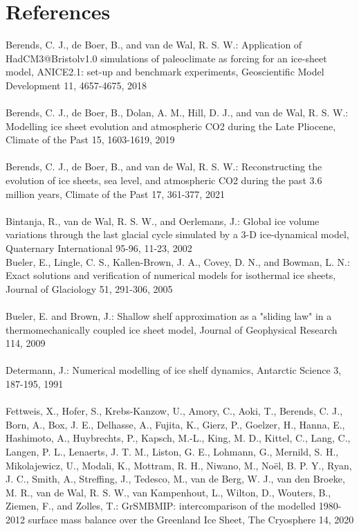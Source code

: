 \documentclass{article}
\begin{document}
\newpage
\section{References}

Berends, C. J., de Boer, B., and van de Wal, R. S. W.: Application of HadCM3@Bristolv1.0 simulations of paleoclimate as forcing for an ice-sheet model, ANICE2.1: set-up and benchmark experiments, Geoscientific Model Development 11, 4657-4675, 2018\\
\\
Berends, C. J., de Boer, B., Dolan, A. M., Hill, D. J., and van de Wal, R. S. W.: Modelling ice sheet evolution and atmospheric CO2 during the Late Pliocene, Climate of the Past 15, 1603-1619, 2019\\
\\
Berends, C. J., de Boer, B., and van de Wal, R. S. W.: Reconstructing the evolution of ice sheets, sea level, and atmospheric CO2 during the past 3.6 million years, Climate of the Past 17, 361-377, 2021\\
\\
Bintanja, R., van de Wal, R. S. W., and Oerlemans, J.: Global ice volume variations through the last glacial cycle simulated by a 3-D ice-dynamical model, Quaternary International 95-96, 11-23, 2002\
\\
Bueler, E., Lingle, C. S., Kallen-Brown, J. A., Covey, D. N., and Bowman, L. N.: Exact solutions and verification of numerical models for isothermal ice sheets, Journal of Glaciology 51, 291-306, 2005\\
\\
Bueler, E. and Brown, J.: Shallow shelf approximation as a "sliding law" in a thermomechanically coupled ice sheet model, Journal of Geophysical Research 114, 2009\\
\\
Determann, J.: Numerical modelling of ice shelf dynamics, Antarctic Science 3, 187-195, 1991\\
\\
Fettweis, X., Hofer, S., Krebs-Kanzow, U., Amory, C., Aoki, T., Berends, C. J., Born, A., Box, J. E., Delhasse, A., Fujita, K., Gierz, P., Goelzer, H., Hanna, E., Hashimoto, A., Huybrechts, P., Kapsch, M.-L., King, M. D., Kittel, C., Lang, C., Langen, P. L., Lenaerts, J. T. M., Liston, G. E., Lohmann, G., Mernild, S. H., Mikolajewicz, U., Modali, K., Mottram, R. H., Niwano, M., Noël, B. P. Y., Ryan, J. C., Smith, A., Streffing, J., Tedesco, M., van de Berg, W. J., van den Broeke, M. R., van de Wal, R. S. W., van Kampenhout, L., Wilton, D., Wouters, B., Ziemen, F., and Zolles, T.: GrSMBMIP: intercomparison of the modelled 1980-2012 surface mass balance over the Greenland Ice Sheet, The Cryosphere 14, 2020\\
\end{document}
